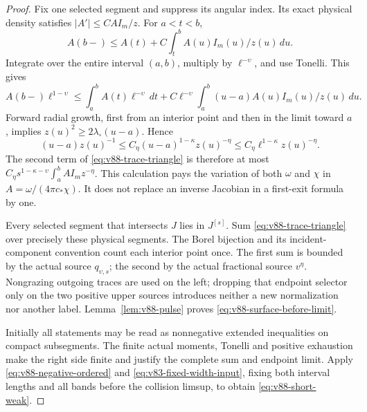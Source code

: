 \begin{proof}
Fix one selected segment and suppress its angular index. Its exact
physical density satisfies $|A'|\le C A I_m/z$. For $a<t<b$,
\[
 A(b-)\le A(t)+C\int_t^b A(u)I_m(u)/z(u)\,du.
\]
Integrate over the entire interval $(a,b)$, multiply by
$\ell^{-\upsilon}$, and use Tonelli. This gives
\begin{equation}\label{eq:v88-trace-triangle}
 A(b-)\ell^{1-\upsilon}\le
  \int_a^b A(t)\ell^{-\upsilon}\,dt
   +C\ell^{-\upsilon}\int_a^b (u-a)A(u)I_m(u)/z(u)\,du.
\end{equation}
Forward radial growth, first from an interior point and then in the
limit toward $a$, implies $z(u)^2\ge2\lambda_\circ(u-a)$. Hence
\[
 (u-a)z(u)^{-1}
 \le C_\eta(u-a)^{1-\kappa}z(u)^{-\eta}
 \le C_\eta\ell^{1-\kappa}z(u)^{-\eta}.
\]
The second term of \eqref{eq:v88-trace-triangle} is therefore at
most $C_\eta s^{1-\kappa-\upsilon}\int_a^b A I_mz^{-\eta}$.
This calculation pays the variation of both $\omega$ and $\chi$
in $A=\omega/(4\pi c_*\chi)$. It does not replace an inverse
Jacobian in a first-exit formula by one.

Every selected segment that intersects $J$ lies in $J^{[s]}$.
Sum \eqref{eq:v88-trace-triangle} over precisely these physical
segments. The Borel bijection and its incident-component convention
count each interior point once. The first sum is bounded by the
actual source $q_{\upsilon,s}$; the second by the actual fractional
source $v^\eta$. Nongrazing outgoing traces are used on the left;
dropping that endpoint selector only on the two positive upper
sources introduces neither a new normalization nor another label.
Lemma~\ref{lem:v88-pulse} proves \eqref{eq:v88-surface-before-limit}.

Initially all statements may be read as nonnegative extended
inequalities on compact subsegments. The finite actual moments,
Tonelli and positive exhaustion make the right side finite and
justify the complete sum and endpoint limit. Apply
\eqref{eq:v88-negative-ordered} and
\eqref{eq:v83-fixed-width-input}, fixing both interval lengths and
all bands before the collision limsup, to obtain
\eqref{eq:v88-short-weak}.
\end{proof}

